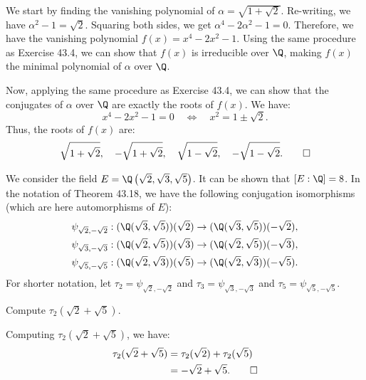 \begin{solution}
  We start by finding the vanishing polynomial of $\alpha = \sqrt{1 + \sqrt{2}}$. Re-writing, we have $\alpha^2 - 1 = \sqrt{2}$. Squaring both sides, we get $\alpha^4 - 2\alpha^2 - 1 = 0$. Therefore, we have the vanishing polynomial $f(x) = x^4 - 2x^2 - 1$. Using the same procedure as Exercise 43.4, we can show that $f(x)$ is irreducible over $\Q$, making $f(x)$ the minimal polynomial of $\alpha$ over $\Q$.

  Now, applying the same procedure as Exercise 43.4, we can show that the conjugates of $\alpha$ over $\Q$ are exactly the roots of $f(x)$. We have:
  \[%
    x^4 - 2x^2 - 1 = 0 \quad \Longleftrightarrow \quad x^2 = 1 \pm \sqrt{2}
  .\]%
  Thus, the roots of $f(x)$ are:
  \[%
    \sqrt{1 + \sqrt{2}}, \quad -\sqrt{1 + \sqrt{2}}, \quad \sqrt{1 - \sqrt{2}}, \quad -\sqrt{1 - \sqrt{2}}
  .\qedhere\]%
\end{solution}

\medskip

We consider the field $E = \Q\left(\sqrt{2}, \sqrt{3}, \sqrt{5}\right)$. It can be shown that $[E : \Q] = 8$. In the notation of Theorem 43.18, we have the following conjugation isomorphisms (which are here automorphisms of $E$):
\begin{align*}
  \psi_{\sqrt{2},-\sqrt{2}} : (\Q(\sqrt{3}, \sqrt{5}))(\sqrt{2}) &\to (\Q(\sqrt{3}, \sqrt{5}))(-\sqrt{2}), \\
  \psi_{\sqrt{3},-\sqrt{3}} : (\Q(\sqrt{2}, \sqrt{5}))(\sqrt{3}) &\to (\Q(\sqrt{2}, \sqrt{5}))(-\sqrt{3}), \\
  \psi_{\sqrt{5},-\sqrt{5}} : (\Q(\sqrt{2}, \sqrt{3}))(\sqrt{5}) &\to (\Q(\sqrt{2}, \sqrt{3}))(-\sqrt{5})
.\end{align*}
For shorter notation, let $\tau_2 = \psi_{\sqrt{2},-\sqrt{2}}$ and $\tau_3 = \psi_{\sqrt{3},-\sqrt{3}}$ and $\tau_5 = \psi_{\sqrt{5},-\sqrt{5}}$.

\medskip

\begin{problem}[43.10]
  Compute $\tau_2(\sqrt{2} + \sqrt{5})$.
\end{problem}

\begin{solution}
  Computing $\tau_2(\sqrt{2} + \sqrt{5})$, we have:
  \begin{align*}
    \tau_2(\sqrt{2} + \sqrt{5}) &= \tau_2(\sqrt{2}) + \tau_2(\sqrt{5}) \\
                                &= -\sqrt{2} + \sqrt{5}
  .\qedhere\end{align*}
\end{solution}

